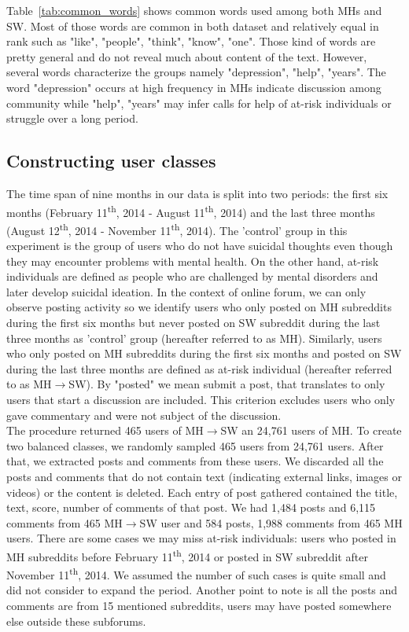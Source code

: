 Table~\ref{tab:common_words} shows common words used among both MHs and SW. Most of those words are common in both dataset and relatively equal in rank such as "like", "people", "think", "know", "one". Those kind of words are pretty general and do not reveal much about content of the text. However, several words characterize the groups namely "depression", "help", "years". The word "depression" occurs at high frequency in MHs indicate discussion among community while "help", "years" may infer calls for help of at-risk individuals or struggle over a long period.
\subsection{Constructing user classes}
The time span of nine months in our data is split into two periods: the first six months (February 11\textsuperscript{th}, 2014 - August 11\textsuperscript{th}, 2014) and the last three months (August 12\textsuperscript{th}, 2014 - November 11\textsuperscript{th}, 2014). The 'control' group in this experiment is the group of users who do not have suicidal thoughts even though they may encounter problems with mental health. On the other hand, at-risk individuals are defined as people who are challenged by mental disorders and later develop suicidal ideation. In the context of online forum, we can only observe posting activity so we identify users who only posted on MH subreddits during the first six months but never posted on SW subreddit during the last three months as 'control' group (hereafter referred to as MH). Similarly, users who only posted on MH subreddits during the first six months and posted on SW during the last three months are defined as at-risk individual (hereafter referred to as MH$\rightarrow$SW). By "posted" we mean submit a post, that translates to only users that start a discussion are included. This criterion excludes users who only gave commentary and were not subject of the discussion.\\
The procedure returned 465 users of MH$\rightarrow$SW an 24,761 users of MH. To create two balanced classes, we randomly sampled 465 users from 24,761 users. After that, we extracted posts and comments from these users. We discarded all the posts and comments that do not contain text (indicating external links, images or videos) or the content is deleted. Each entry of post gathered contained the title, text, score, number of comments of that post. We had 1,484 posts and 6,115 comments from 465 MH$\rightarrow$SW user and 584 posts, 1,988 comments from 465 MH users. There are some cases we may miss at-risk individuals: users who posted in MH subreddits before February 11\textsuperscript{th}, 2014 or posted in SW subreddit after November 11\textsuperscript{th}, 2014. We assumed the number of such cases is quite small and did not consider to expand the period. Another point to note is all the posts and comments are from 15 mentioned subreddits, users may have posted somewhere else outside these subforums. 
